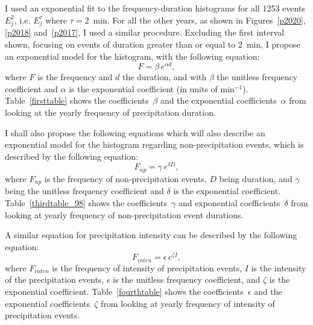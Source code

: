 \documentclass[11pt]{report}
\begin{document}
I used an exponential fit to the frequency-duration histograms for all 1253
events $E_j^2$, i.e. $E_j^\tau$ where $\tau=2$~min. For all the other years,
as shown in Figures~\ref{p2020}, \ref{p2018} and~\ref{p2017}, I used a
similar procedure. Excluding the first interval shown, focusing on events of
duration greater than or equal to 2~min, I propose an exponential model for
the histogram, with the following equation:
\begin{equation}\label{expod}
  F = \beta \,e^{\alpha d},
\end{equation}
where $F$ is the frequency and $d$ the duration, and with $\beta$ the
unitless frequency coefficient and $\alpha$ is the exponential coefficient
(in units of min$^{-1}$). Table~\ref{firsttable} shows the
coefficients~$\beta$ and the exponential coefficients~$\alpha$ from looking
at the yearly frequency of precipitation duration.

I shall also propose the following equations which will also describe an
exponential model for the histogram regarding non-precipitation events,
which is described by the following equation:
\begin{equation}\label{expod_np}
	F_{np} = \gamma \,e^{\delta D},
\end{equation}
where $F_{np}$ is the frequency of non-precipitation events, $D$ being
duration, and $\gamma $ being the unitless frequency coefficient and
$\delta$ is the exponential coefficient. Table~\ref{thirdtable_98} shows the
coefficients~$\gamma$ and exponential coefficients~$\delta$ from looking at
yearly frequency of non-precipitation event durations.

A similar equation for precipitation intensity can be described by the
following equation:
\begin{equation}\label{expod_inten}
  F_{inten} = \epsilon \,e^{\zeta I},
\end{equation}
where $F_{inten}$ is the frequency of intensity of precipitation events, $I$
is the intensity of the precipitation events, $\epsilon$ is the unitless
frequency coefficient, and $\zeta$ is the exponential
coefficient. Table~\ref{fourthtable} shows the coefficients~$\epsilon$ and
the exponential coefficients~$\zeta$ from looking at yearly frequency of
intensity of precipitation events.
\end{document}

